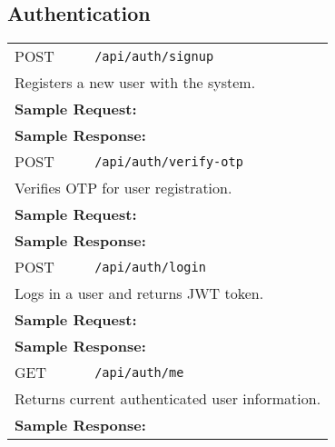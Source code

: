 \documentclass[11pt,a4paper]{article}
\begin{document}
\subsection{Authentication}
\begin{longtable}{p{2.5cm}p{10cm}}
POST & \texttt{/api/auth/signup} \\
\multicolumn{2}{p{13cm}}{Registers a new user with the system.} \\
\multicolumn{2}{p{13cm}}{\textbf{Sample Request:}}
\begin{lstlisting}[language=json]
{"name":"John Doe","email":"john@example.com","password":"Passw0rd!","role":"coach"}
\end{lstlisting} \\
\multicolumn{2}{p{13cm}}{\textbf{Sample Response:}}
\begin{lstlisting}[language=json]
{"success": true, "data": {"userId": "64f1a2b3c4d5e6f7a8b9c0d1", "role": "coach"}}
\end{lstlisting} \\
POST & \texttt{/api/auth/verify-otp} \\
\multicolumn{2}{p{13cm}}{Verifies OTP for user registration.} \\
\multicolumn{2}{p{13cm}}{\textbf{Sample Request:}}
\begin{lstlisting}[language=json]
{"email":"john@example.com","otp":"123456"}
\end{lstlisting} \\
\multicolumn{2}{p{13cm}}{\textbf{Sample Response:}}
\begin{lstlisting}[language=json]
{"success": true, "message": "OTP verified successfully"}
\end{lstlisting} \\
POST & \texttt{/api/auth/login} \\
\multicolumn{2}{p{13cm}}{Logs in a user and returns JWT token.} \\
\multicolumn{2}{p{13cm}}{\textbf{Sample Request:}}
\begin{lstlisting}[language=json]
{"email":"john@example.com","password":"Passw0rd!"}
\end{lstlisting} \\
\multicolumn{2}{p{13cm}}{\textbf{Sample Response:}}
\begin{lstlisting}[language=json]
{"success": true, "token": "eyJhbGciOiJIUzI1NiIsInR5cCI6IkpXVCJ9...", "user": {"id": "64f1a2b3c4d5e6f7a8b9c0d1", "role": "coach"}}
\end{lstlisting} \\
GET & \texttt{/api/auth/me} \\
\multicolumn{2}{p{13cm}}{Returns current authenticated user information.} \\
\multicolumn{2}{p{13cm}}{\textbf{Sample Response:}}
\begin{lstlisting}[language=json]
{"success": true, "data": {"id": "64f1a2b3c4d5e6f7a8b9c0d1", "name": "John Doe", "email": "john@example.com", "role": "coach"}}
\end{lstlisting} \\
\end{longtable}
\end{document}
